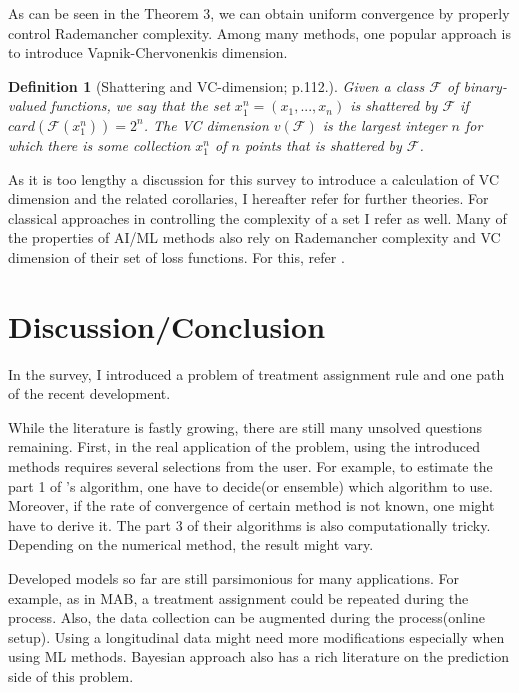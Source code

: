 \documentclass[11pt]{article}
\newtheorem{definition}[theorem]{Definition}
\begin{document}
As can be seen in the Theorem 3, we can obtain uniform convergence by properly control Rademancher complexity. Among many methods, one popular approach is to  introduce Vapnik-Chervonenkis dimension.
		
	\begin{definition}[Shattering and VC-dimension; \cite{wainwright2019high} p.112.]
		Given a class $\mathcal{F}$ of binary-valued functions, we say that the set $x_1^n = (x_1, ..., x_n)$ is shattered by $\mathcal{F}$ if $card(\mathcal{F}(x_1^n))=2^n$. The VC dimension $v(\mathcal{F})$ is the largest integer $n$ for which there is some collection $x_1^n$ of $n$ points that is shattered by $\mathcal{F}$.
	\end{definition}
	
As it is too lengthy a discussion for this survey to introduce a calculation of VC dimension and the related corollaries, I hereafter refer \cite{wainwright2019high} for further theories. For classical approaches in controlling the complexity of a set I refer \cite{van1996weak, van2000asymptotic} as well. Many of the properties of AI/ML methods also rely on Rademancher complexity and VC dimension of their set of loss functions. For this, refer \cite{mohri2018foundations}.


	\section{Discussion/Conclusion}
	In the survey, I introduced a problem of treatment assignment rule and one path of the recent development.
	
	While the literature is fastly growing, there are still many unsolved questions remaining. First, in the real application of the problem, using the introduced methods requires several selections from the user. For example, to estimate the part 1 of \cite{Athey.2017txo}'s algorithm, one have to decide(or ensemble) which algorithm to use. Moreover, if the rate of convergence of certain method is not known, one might have to derive it. The part 3 of their algorithms is also computationally tricky. Depending on the numerical method, the result might vary.
	
	Developed models so far are still parsimonious for many applications. For example, as in MAB, a treatment assignment could be repeated during the process. Also, the data collection can be augmented during the process(online setup). Using a longitudinal data might need more modifications especially when using ML methods. Bayesian approach also has a rich literature on the prediction side of this problem.
	
\end{document}
